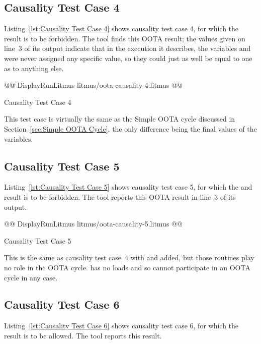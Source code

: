 \documentclass[10]{article}
\begin{document}
\subsection{Causality Test Case 4}
\label{app:Causality Test Case 4}

Listing~\ref{lst:Causality Test Case 4}
shows causality test case 4, for which the  result
is to be forbidden.
The  tool finds this OOTA result;
the  values given on line~3 of its output indicate
that in the execution it describes, the variables  and~ were never
assigned any specific value, so they could just as well be equal to
one as to anything else.

\begin{listing}[tbp]
@@ DisplayRunLitmus litmus/oota-causality-4.litmus @@
\caption{Causality Test Case 4}
\label{lst:Causality Test Case 4}
\end{listing}

This test case is virtually the same as the Simple OOTA cycle
discussed in Section~\ref{sec:Simple OOTA Cycle}, the only difference
being the final values of the variables.

\subsection{Causality Test Case 5}
\label{app:Causality Test Case 5}

Listing~\ref{lst:Causality Test Case 5}
shows causality test case 5, for which the  and 
result is to be forbidden.
The  tool reports this OOTA result in line~3 of its output.

\begin{listing}[tbp]
@@ DisplayRunLitmus litmus/oota-causality-5.litmus @@
\caption{Causality Test Case 5}
\label{lst:Causality Test Case 5}
\end{listing}

This is the same as causality test case~4 with  and 
added, but those routines play no role in the OOTA cycle.
 has no loads and so cannot participate in an OOTA cycle in
any case.

\subsection{Causality Test Case 6}
\label{app:Causality Test Case 6}

Listing~\ref{lst:Causality Test Case 6}
shows causality test case 6, for which the 
result is to be allowed.
The  tool reports this result.
\end{document}
